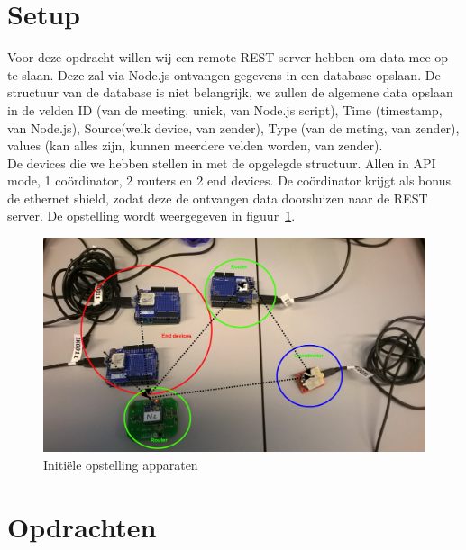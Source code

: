 \documentclass[12pt]{article}
\begin{document}
\clearpage

\section{Setup}

Voor deze opdracht willen wij een remote REST server hebben om data mee op te slaan. Deze zal via Node.js ontvangen gegevens in een database opslaan. De structuur van de database is niet belangrijk, we zullen de algemene data opslaan in de velden ID (van de meeting, uniek, van Node.js script), Time (timestamp, van Node.js), Source(welk device, van zender), Type (van de meting, van zender), values (kan alles zijn, kunnen meerdere velden worden, van zender). \\
De devices die we hebben stellen in met de opgelegde structuur. Allen in API mode, 1 coördinator, 2 routers en 2 end devices. De coördinator krijgt als bonus de ethernet shield, zodat deze de ontvangen data doorsluizen naar de REST server. De opstelling wordt weergegeven in figuur~\ref{fig:setup1}.\\
\clearpage
\begin{figure}
\begin{center}
\includegraphics[scale=.4]{Test_setup_1.jpg}
\caption{Initiële opstelling apparaten}
\label{fig:setup1}
\end{center}
\end{figure}
\clearpage

\section{Opdrachten}
\end{document}
